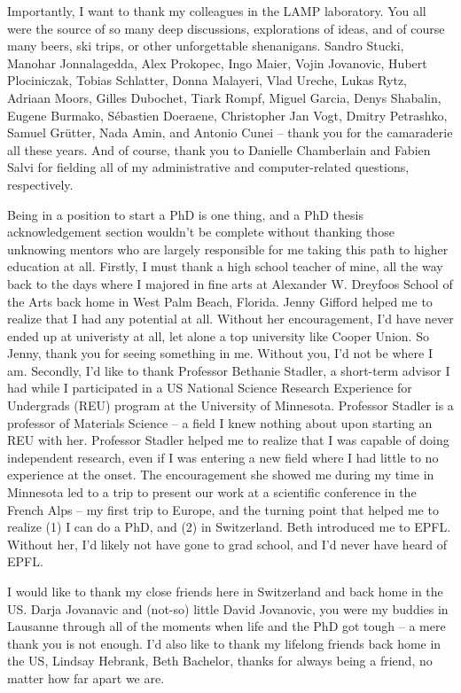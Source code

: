 \vspace{0.5cm}
Importantly, I want to thank my colleagues in the LAMP laboratory. You
all were the source of so many deep discussions, explorations of ideas, and of
course many beers, ski trips, or other unforgettable shenanigans. Sandro Stucki,
Manohar Jonnalagedda, Alex Prokopec, Ingo Maier, Vojin Jovanovic, Hubert
Plociniczak, Tobias Schlatter, Donna Malayeri, Vlad Ureche, Lukas Rytz, Adriaan
Moors, Gilles Dubochet, Tiark Rompf, Miguel Garcia, Denys Shabalin, Eugene
Burmako, S\'{e}bastien Doeraene, Christopher Jan Vogt, Dmitry Petrashko,
Samuel Gr\"{u}tter, Nada Amin, and Antonio Cunei -- thank you for the
camaraderie all these years. And of course, thank you to Danielle Chamberlain
and Fabien Salvi for fielding all of my administrative and computer-related
questions, respectively.

\vspace{0.5cm}
Being in a position to start a PhD is one thing, and a PhD thesis
acknowledgement section wouldn't be complete without thanking those unknowing
mentors who are largely responsible for me taking this path to higher education
at all. Firstly, I must thank a high school teacher of mine, all the way back to
the days where I majored in fine arts at Alexander W. Dreyfoos School of the
Arts back home in West Palm Beach, Florida. Jenny Gifford helped me to realize
that I had any potential at all. Without her encouragement, I'd have never ended
up at univeristy at all, let alone a top university like Cooper Union. So Jenny,
thank you for seeing something in me. Without you, I'd not be where I am.
Secondly, I'd like to thank Professor Bethanie Stadler, a short-term advisor I
had while I participated in a US National Science Research Experience for
Undergrads (REU) program at the University of Minnesota. Professor Stadler is a
professor of Materials Science -- a field I knew nothing about upon starting an
REU with her. Professor Stadler helped me to realize that I was capable of doing
independent research, even if I was entering a new field where I had little to
no experience at the onset. The encouragement she showed me during my time in
Minnesota led to a trip to present our work at a scientific conference in the
French Alps -- my first trip to Europe, and the turning point that helped me to
realize (1) I can do a PhD, and (2) in Switzerland. Beth introduced me to EPFL.
Without her, I'd likely not have gone to grad school, and I'd never have heard
of EPFL.

\vspace{0.5cm}
I would like to thank my close friends here in Switzerland and back home in the
US. Darja Jovanavic and (not-so) little David Jovanovic, you were my buddies in
Lausanne through all of the moments when life and the PhD got tough -- a mere
thank you is not enough. I'd also like to thank my lifelong friends back home in
the US, Lindsay Hebrank, Beth Bachelor, thanks for always being a friend, no
matter how far apart we are.

